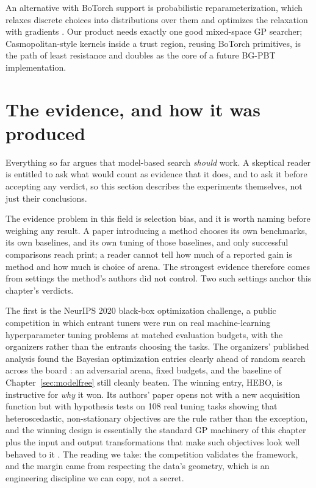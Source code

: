 An alternative with BoTorch support is probabilistic reparameterization,
which relaxes discrete choices into distributions over them and
optimizes the relaxation with gradients \citep{daulton2022pr}. Our
product needs exactly one good mixed-space GP searcher; Casmopolitan-style
kernels inside a trust region, reusing BoTorch primitives, is the path of
least resistance and doubles as the core of a future BG-PBT
implementation.

\section{The evidence, and how it was produced}
\label{sec:bo-evidence}

Everything so far argues that model-based search \emph{should} work.
A skeptical reader is entitled to ask what would count as evidence that
it does, and to ask it before accepting any verdict, so this section
describes the experiments themselves, not just their conclusions.

The evidence problem in this field is selection bias, and it is worth
naming before weighing any result. A paper introducing a method chooses
its own benchmarks, its own baselines, and its own tuning of those
baselines, and only successful comparisons reach print; a reader
cannot tell how much of a reported gain is method and how much is
choice of arena. The strongest evidence therefore comes from settings
the method's authors did not control. Two such settings anchor this
chapter's verdicts.

The first is the NeurIPS 2020 black-box optimization challenge, a
public competition in which entrant tuners were run on real
machine-learning hyperparameter tuning problems at matched evaluation
budgets, with the organizers rather than the entrants choosing the
tasks. The organizers' published analysis found the Bayesian
optimization entries clearly ahead of random search across the board
\citep{turner2021bayesian}: an adversarial arena, fixed budgets, and
the baseline of Chapter~\ref{sec:modelfree} still cleanly beaten. The
winning entry, HEBO, is instructive for \emph{why} it won. Its
authors' paper opens not with a new acquisition function but with
hypothesis tests on 108 real tuning tasks showing that
heteroscedastic, non-stationary objectives are the rule rather than
the exception, and the winning design is essentially the standard GP
machinery of this chapter plus the input and output transformations
that make such objectives look well behaved to it
\citep{cowenrivers2022hebo}. The reading we take: the competition
validates the framework, and the margin came from respecting the
data's geometry, which is an engineering discipline we can copy, not a
secret.

